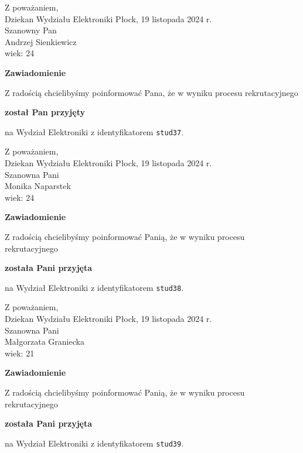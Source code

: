 \documentclass[12pt,a4paper]{article}
\begin{document}
\noindent
Z poważaniem,\\
Dziekan
Wydziału Elektroniki
\newpage
\hfill Płock, 19 listopada 2024 r.\\ 
\noindent 
Szanowny Pan \\
Andrzej Sienkiewicz \\
wiek: 24

\bigskip

\begin{center}
{\Large\textbf{Zawiadomienie}}
\end{center}
\bigskip
Z radością chcielibyśmy poinformować Pana, że w wyniku procesu rekrutacyjnego
\begin{center}
\textsf{\textbf{został Pan przyjęty}} 
\end{center}
na Wydział Elektroniki z identyfikatorem \verb|stud37|.
\vspace{2cm}

\noindent
Z poważaniem,\\
Dziekan
Wydziału Elektroniki
\newpage
\hfill Płock, 19 listopada 2024 r.\\ 
\noindent 
Szanowna Pani \\
Monika Naparstek \\
wiek: 24

\bigskip

\begin{center}
{\Large\textbf{Zawiadomienie}}
\end{center}
\bigskip
Z radością chcielibyśmy poinformować Panią, że w wyniku procesu rekrutacyjnego
\begin{center}
\textsf{\textbf{została Pani przyjęta}} 
\end{center}
na Wydział Elektroniki z identyfikatorem \verb|stud38|.
\vspace{2cm}

\noindent
Z poważaniem,\\
Dziekan
Wydziału Elektroniki
\newpage
\hfill Płock, 19 listopada 2024 r.\\ 
\noindent 
Szanowna Pani \\
Małgorzata Graniecka \\
wiek: 21

\bigskip

\begin{center}
{\Large\textbf{Zawiadomienie}}
\end{center}
\bigskip
Z radością chcielibyśmy poinformować Panią, że w wyniku procesu rekrutacyjnego
\begin{center}
\textsf{\textbf{została Pani przyjęta}} 
\end{center}
na Wydział Elektroniki z identyfikatorem \verb|stud39|.
\vspace{2cm}
\end{document}
